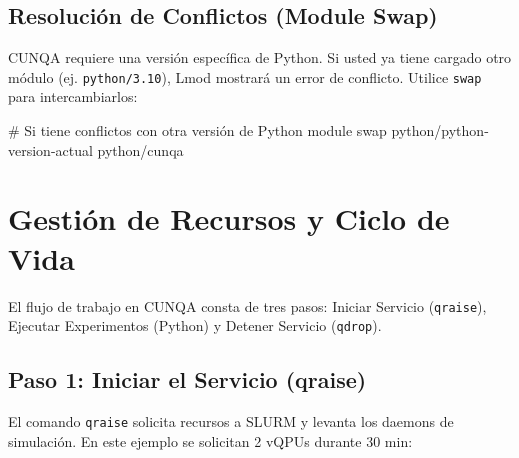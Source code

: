 \documentclass[a4paper,11pt]{article}
\begin{document}

\subsection{Resolución de Conflictos (Module Swap)}
CUNQA requiere una versión específica de Python. Si usted ya tiene cargado otro módulo (ej. \texttt{python/3.10}), Lmod mostrará un error de conflicto. Utilice \texttt{swap} para intercambiarlos:

\begin{terminal}
# Si tiene conflictos con otra versión de Python
module swap python/python-version-actual python/cunqa
\end{terminal}



\section{Gestión de Recursos y Ciclo de Vida}

El flujo de trabajo en CUNQA consta de tres pasos: Iniciar Servicio (\texttt{qraise}), Ejecutar Experimentos (Python) y Detener Servicio (\texttt{qdrop}).

\subsection{Paso 1: Iniciar el Servicio (qraise)}
El comando \texttt{qraise} solicita recursos a SLURM y levanta los daemons de simulación. En este ejemplo se solicitan 2 vQPUs durante 30 min:
\end{document}

